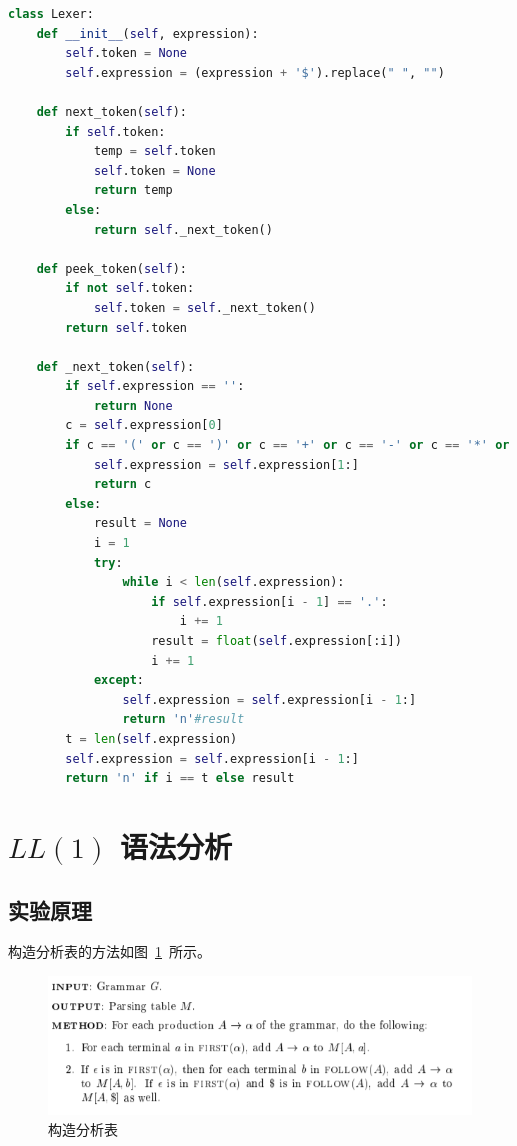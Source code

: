 \documentclass[blue,normal,cn]{elegantnote}
\begin{document}
\begin{lstlisting}[language=python]
class Lexer:
    def __init__(self, expression):
        self.token = None
        self.expression = (expression + '$').replace(" ", "")

    def next_token(self):
        if self.token:
            temp = self.token
            self.token = None
            return temp
        else:
            return self._next_token()

    def peek_token(self):
        if not self.token:
            self.token = self._next_token()
        return self.token

    def _next_token(self):
        if self.expression == '':
            return None
        c = self.expression[0]
        if c == '(' or c == ')' or c == '+' or c == '-' or c == '*' or c == '/' or c == '$':
            self.expression = self.expression[1:]
            return c
        else:
            result = None
            i = 1
            try:
                while i < len(self.expression):
                    if self.expression[i - 1] == '.':
                        i += 1
                    result = float(self.expression[:i])
                    i += 1
            except:
                self.expression = self.expression[i - 1:]
                return 'n'#result
        t = len(self.expression)
        self.expression = self.expression[i - 1:]
        return 'n' if i == t else result
\end{lstlisting}

\section{$LL(1)$ 语法分析}

\subsection{实验原理}
构造分析表的方法如图~\ref{fig:4.2}~所示。

\begin{figure}[!htbp]
    \centering
    \includegraphics[width=.8\textwidth]{A.png}
    \caption{构造分析表}
    \label{fig:4.2}
\end{figure}
\end{document}
